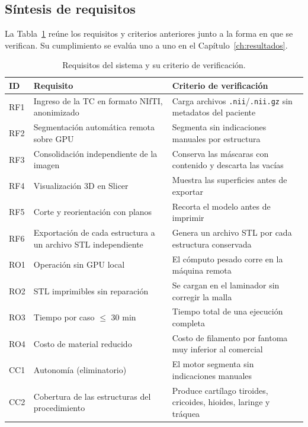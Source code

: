 \subsection{Síntesis de requisitos}

La Tabla~\ref{tab:requisitos} reúne los requisitos y criterios anteriores junto a la forma en que se verifican. Su cumplimiento se evalúa uno a uno en el Capítulo~\ref{ch:resultados}.\\

\begin{table}[H]
  \centering
  \caption{Requisitos del sistema y su criterio de verificación.}
  \vspace{5pt}
  \label{tab:requisitos}
  \small
  \begin{tabular}{p{1.1cm} p{6.2cm} p{5.6cm}}
    \hline
    \textbf{ID} & \textbf{Requisito} & \textbf{Criterio de verificación} \\
    \hline
    RF1 & Ingreso de la TC en formato NIfTI, anonimizado & Carga archivos \texttt{.nii}/\texttt{.nii.gz} sin metadatos del paciente \\
    RF2 & Segmentación automática remota sobre GPU & Segmenta sin indicaciones manuales por estructura \\
    RF3 & Consolidación independiente de la imagen & Conserva las máscaras con contenido y descarta las vacías \\
    RF4 & Visualización 3D en Slicer & Muestra las superficies antes de exportar \\
    RF5 & Corte y reorientación con planos & Recorta el modelo antes de imprimir \\
    RF6 & Exportación de cada estructura a un archivo STL independiente & Genera un archivo STL por cada estructura conservada \\
    RO1 & Operación sin GPU local & El cómputo pesado corre en la máquina remota \\
    RO2 & STL imprimibles sin reparación & Se cargan en el laminador sin corregir la malla \\
    RO3 & Tiempo por caso $\leq$ 30 min & Tiempo total de una ejecución completa \\
    RO4 & Costo de material reducido & Costo de filamento por fantoma muy inferior al comercial \\
    CC1 & Autonomía (eliminatorio) & El motor segmenta sin indicaciones manuales \\
    CC2 & Cobertura de las estructuras del procedimiento & Produce cartílago tiroides, cricoides, hioides, laringe y tráquea \\

\end{tabular}
\end{table}

